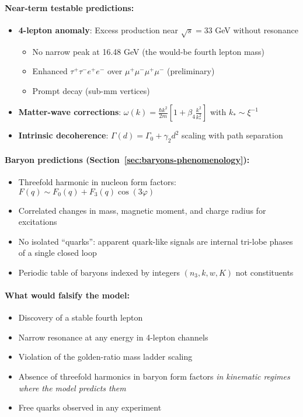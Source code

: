 \paragraph{Near-term testable predictions:}
\begin{itemize}
\item \textbf{4-lepton anomaly}: Excess production near $\sqrt{s} = 33$ GeV without resonance
  \begin{itemize}
  \item No narrow peak at 16.48 GeV (the would-be fourth lepton mass)
  \item Enhanced $\tau^+\tau^-e^+e^-$ over $\mu^+\mu^-\mu^+\mu^-$ (preliminary)
  \item Prompt decay (sub-mm vertices)
  \end{itemize}
\item \textbf{Matter-wave corrections}: $\omega(k) = \frac{\hbar k^2}{2m}\left[1 + \beta_4\frac{k^2}{k_*^2}\right]$ with $k_* \sim \xi^{-1}$
\item \textbf{Intrinsic decoherence}: $\Gamma(d) = \Gamma_0 + \gamma_2 d^2$ scaling with path separation
\end{itemize}

\paragraph{Baryon predictions (Section~\ref{sec:baryons-phenomenology}):}
\begin{itemize}
\item Threefold harmonic in nucleon form factors: $F(q) \sim F_0(q) + F_3(q)\cos(3\varphi)$
\item Correlated changes in mass, magnetic moment, and charge radius for excitations
\item No isolated ``quarks'': apparent quark-like signals are internal tri-lobe phases of a single closed loop
\item Periodic table of baryons indexed by integers $(n_3, k, w, K)$ not constituents
\end{itemize}

\paragraph{What would falsify the model:}
\begin{itemize}
\item Discovery of a stable fourth lepton
\item Narrow resonance at any energy in 4-lepton channels
\item Violation of the golden-ratio mass ladder scaling
\item Absence of threefold harmonics in baryon form factors \emph{in kinematic regimes where the model predicts them}
\item Free quarks observed in any experiment
\end{itemize}

